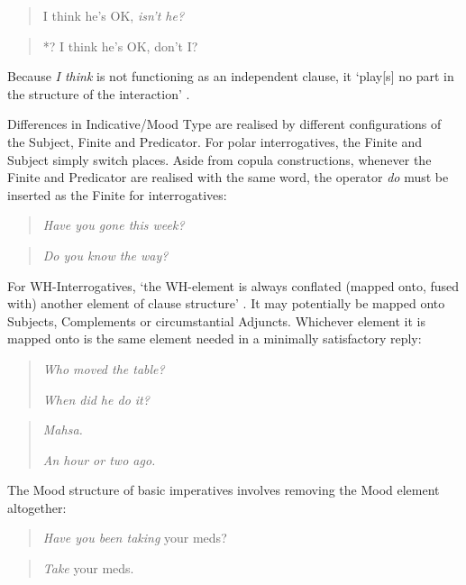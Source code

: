 \begin{multicols}{2}
\begin{quote}
I think he's OK, \emph{isn't he?}
\end{quote}

\begin{quote}
*? I think he's OK, don't I?
\end{quote}
\end{multicols}
%
\noindent Because \emph{I think} is not functioning as an independent clause, it `play[s] no part in the structure of the interaction' \cite[p.~162]{halliday_introduction_2004}.

Differences in Indicative\slash Mood Type are realised by different configurations of the Subject, Finite and Predicator. For polar interrogatives, the Finite and Subject simply switch places. Aside from copula constructions, whenever the Finite and Predicator are realised with the same word, the operator \emph{do} must be inserted as the Finite for interrogatives:

\begin{multicols}{2}
\begin{quote}
\emph{Have you gone this week?}
\end{quote}
\begin{quote}
\emph{Do you know the way?}
\end{quote}
\end{multicols}
%
\noindent For WH\hyp{}Interrogatives, `the WH\hyp{}element is always conflated (mapped onto, fused with) another element of clause structure' \cite[p.~175]{eggins_introduction_2004}. It may potentially be mapped onto Subjects, Complements or circumstantial Adjuncts. Whichever element it is mapped onto is the same element needed in a minimally satisfactory reply:


\begin{multicols}{2}
\begin{quote}
\emph{Who moved the table?}

\emph{When did he do it?}
\end{quote}
\begin{quote}
\emph{Mahsa.}

\emph{An hour or two ago.}
\end{quote}
\end{multicols}

%
\noindent The Mood structure of basic imperatives involves removing the Mood element altogether:

\begin{multicols}{2}
\begin{quote}

\emph{Have you been taking} your meds?
\end{quote}

\begin{quote}

\emph{Take} your meds.
\end{quote}
\end{multicols}

